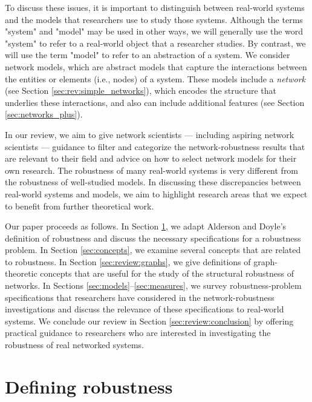 \documentclass{comnet-mod}
\begin{document}
To discuss these issues, it is important to distinguish between real-world systems and the models that researchers use to study those systems. Although the terms "system" and "model" may be used in other ways, we will generally use the word "system" to refer to a real-world object that a researcher studies. By contrast, we will use the term "model" to refer to an abstraction of a system.
We consider network models, which are abstract models that capture the interactions between the entities or elements (i.e., nodes) of a system. These models include a \textit{network} (see Section \ref{sec:rev:simple_networks}), which encodes the structure that underlies these interactions, and also can include additional features (see Section \ref{sec:networks_plus}).

In our review, we aim to give network scientists --- including aspiring network scientists --- guidance to filter and categorize the network-robustness results that are relevant to their field and advice on how to select network models for their own research. The robustness of many real-world systems is very different from the robustness of well-studied models. In discussing these discrepancies between real-world systems and models, we aim to highlight research areas that we expect to benefit from further theoretical work.

Our paper proceeds as follows. In Section \ref{sec:robustness_def}, we adapt Alderson and Doyle's definition of robustness \cite{Alderson2010} and discuss the necessary specifications for a robustness problem. In Section \ref{sec:concepts}, we examine several concepts that are related to robustness. In Section \ref{sec:review:graphs}, we give definitions of graph-theoretic concepts that are useful for the study of the structural robustness of networks. In Sections \ref{sec:models}--\ref{sec:measures}, we survey robustness-problem specifications that researchers have considered in the network-robustness investigations and discuss the relevance of these specifications to real-world systems. We conclude our review in Section \ref{sec:review:conclusion} by offering practical guidance to researchers who are interested in investigating the robustness of real networked systems.


\section{Defining robustness}\label{sec:robustness_def}
\end{document}
